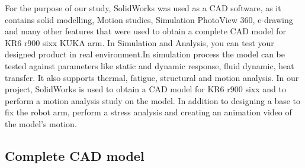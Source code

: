 For the purpose of our study, SolidWorks was used as a CAD software, as it contains solid modelling, Motion studies, Simulation PhotoView 360, e-drawing and many other features that were used to obtain a complete CAD model for KR6 r900 sixx KUKA arm. 
\newline In Simulation and Analysis, you can test your designed product in real environment.In simulation process the model can be tested against parameters like static and dynamic response, fluid dynamic, heat transfer. It also supports thermal, fatigue, structural and motion analysis. 
\newline In our project, SolidWorks is used to obtain a CAD model for KR6 r900 sixx and to perform a motion analysis study on the model. In addition to designing a base to fix the robot arm, perform a stress analysis and creating an animation video of the model’s motion.

\subsection{Complete CAD model}

